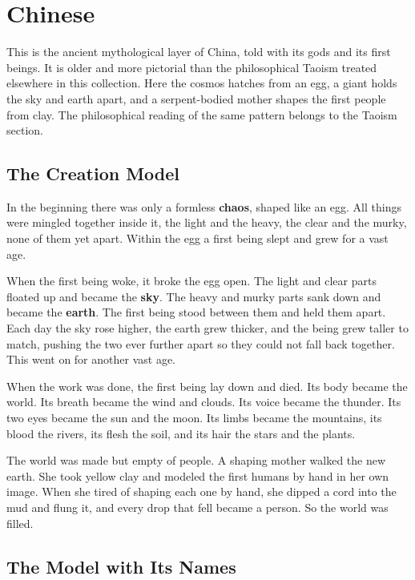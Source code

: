 \section{Chinese}

This is the ancient mythological layer of China, told with its gods and its first beings. It is older and more pictorial than the philosophical Taoism treated elsewhere in this collection. Here the cosmos hatches from an egg, a giant holds the sky and earth apart, and a serpent-bodied mother shapes the first people from clay. The philosophical reading of the same pattern belongs to the Taoism section.

\subsection{The Creation Model}

In the beginning there was only a formless \textbf{chaos}, shaped like an egg. All things were mingled together inside it, the light and the heavy, the clear and the murky, none of them yet apart. Within the egg a first being slept and grew for a vast age.

When the first being woke, it broke the egg open. The light and clear parts floated up and became the \textbf{sky}. The heavy and murky parts sank down and became the \textbf{earth}. The first being stood between them and held them apart. Each day the sky rose higher, the earth grew thicker, and the being grew taller to match, pushing the two ever further apart so they could not fall back together. This went on for another vast age.

When the work was done, the first being lay down and died. Its body became the world. Its breath became the wind and clouds. Its voice became the thunder. Its two eyes became the sun and the moon. Its limbs became the mountains, its blood the rivers, its flesh the soil, and its hair the stars and the plants.

The world was made but empty of people. A shaping mother walked the new earth. She took yellow clay and modeled the first humans by hand in her own image. When she tired of shaping each one by hand, she dipped a cord into the mud and flung it, and every drop that fell became a person. So the world was filled.

\subsection{The Model with Its Names}

